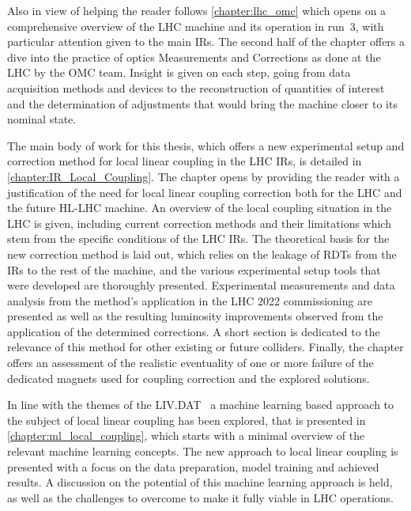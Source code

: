 Also in view of helping the reader follows \cref{chapter:lhc_omc} which opens on a comprehensive overview of the \acrshort{LHC} machine and its operation in \Gls{run}~\num{3}, with particular attention given to the main \glspl{IR}.
The second half of the chapter offers a dive into the practice of \Gls{optics} Measurements and Corrections as done at the LHC by the \acrshort{OMC} team.
Insight is given on each step, going from data acquisition methods and devices to the reconstruction of quantities of interest and the determination of adjustments that would bring the machine closer to its nominal state.

The main body of work for this thesis, which offers a new experimental setup and correction method for local linear coupling in the \acrshort{LHC} \glspl{IR}, is detailed in \cref{chapter:IR_Local_Coupling}.
The chapter opens by providing the reader with a justification of the need for local linear coupling correction both for the \acrshort{LHC} and the future \acrshort{HL-LHC} machine.
An overview of the local coupling situation in the \acrshort{LHC} is given, including current correction methods and their limitations which stem from the specific conditions of the \acrshort{LHC} \glspl{IR}.
The theoretical basis for the new correction method is laid out, which relies on the leakage of \glspl{RDT} from the \glspl{IR} to the rest of the machine, and the various experimental setup tools that were developed are thoroughly presented.
Experimental measurements and data analysis from the method's application in the \acrshort{LHC} \num{2022} commissioning are presented as well as the resulting \gls{luminosity} improvements observed from the application of the determined corrections.
A short section is dedicated to the relevance of this method for other existing or future colliders.
Finally, the chapter offers an assessment of the realistic eventuality of one or more failure of the dedicated magnets used for coupling correction and the explored solutions.

In line with the themes of the \gls{LIV.DAT}~\cite{Website:LIVDAT} a machine learning based approach to the subject of local linear coupling has been explored, that is presented in \cref{chapter:ml_local_coupling}, which starts with a minimal overview of the relevant machine learning concepts.
The new approach to local linear coupling is presented with a focus on the data preparation, model training and achieved results.
A discussion on the potential of this machine learning approach is held, as well as the challenges to overcome to make it fully viable in LHC operations.

